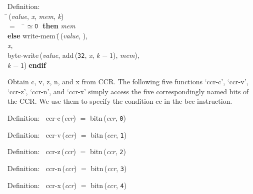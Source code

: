 \begin{tabbing}{\sc Definition}: \\  
\=\,({\it{value\/}}, {\it{x\/}}, {\it{mem\/}}, {\it{k\/}}) \\ 
$=$$\;\;\;\;$\= $\simeq {\tt{0}}$$\;\;${\bf then }{\it{mem\/}} \\ 
{\bf else }{\rm{write-mem}}\,(\=\,({\it{value\/}}, {}), \\ 
{\it{x\/}}, \\ 
{\rm{byte-write}}\,({\it{value\/}}, {\rm{add}}\,({\tt{32}}, {\it{x\/}}, {\it{k\/}} $-\;1$), {\it{mem\/}}), \\ 
{\it{k\/}} $-\;1$)\-$\;${\bf  endif}\-\-
\end{tabbing}

 Obtain c, v, z, n, and x from CCR.  The following five functions `ccr-c',
 `ccr-v', `ccr-z', `ccr-n', and `ccr-x' simply access the five
 correspondingly named bits of the CCR.  We use them to
 specify the condition cc in the bcc instruction.
\begin{tabbing}{\sc Definition}:$\;\;$
{\rm{ccr-c}}\,({\it{ccr\/}}) $=$ {\rm{bitn}}\,({\it{ccr\/}}, {\tt{0}})
\end{tabbing}

\begin{tabbing}{\sc Definition}:$\;\;$
{\rm{ccr-v}}\,({\it{ccr\/}}) $=$ {\rm{bitn}}\,({\it{ccr\/}}, {\tt{1}})
\end{tabbing}

\begin{tabbing}{\sc Definition}:$\;\;$
{\rm{ccr-z}}\,({\it{ccr\/}}) $=$ {\rm{bitn}}\,({\it{ccr\/}}, {\tt{2}})
\end{tabbing}

\begin{tabbing}{\sc Definition}:$\;\;$
{\rm{ccr-n}}\,({\it{ccr\/}}) $=$ {\rm{bitn}}\,({\it{ccr\/}}, {\tt{3}})
\end{tabbing}

\begin{tabbing}{\sc Definition}:$\;\;$
{\rm{ccr-x}}\,({\it{ccr\/}}) $=$ {\rm{bitn}}\,({\it{ccr\/}}, {\tt{4}})
\end{tabbing}

